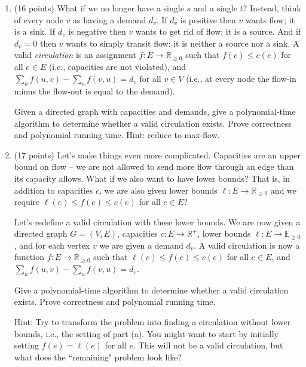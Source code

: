 \documentclass[11pt]{article}
\begin{document}
\begin{enumerate}
\item (16 points) What if we no longer have a single $s$ and a single $t$?  Instead, think of every node $v$ as having a demand $d_v$.  If $d_v$ is positive then $v$ wants flow; it is a sink.  If $d_v$ is negative then $v$ wants to get rid of flow; it is a source.  And if $d_v = 0$ then $v$ wants to simply transit flow; it is neither a source nor a sink.  A valid \emph{circulation} is an assignment $f : E \rightarrow \mathbb{R}_{\geq 0}$ such that $f(e) \leq c(e)$ for all $e \in E$ (i.e., capacities are not violated), and $\sum_{u} f(u,v) - \sum_{u} f(v,u) = d_v$ for all $v \in V$ (i.e., at every node the flow-in minus the flow-out is equal to the demand).  

Given a directed graph with capacities and demands, give a polynomial-time algorithm to determine whether a valid circulation exists.  Prove correctness and polynomial running time.  Hint: reduce to max-flow.

\item (17 points) Let's make things even more complicated.  Capacities are an upper bound on flow -- we are not allowed to send more flow through an edge than its capacity allows.  What if we also want to have lower bounds?  That is, in addition to capacities $c$, we are also given lower bounds $\ell : E \rightarrow \mathbb{R}_{\geq 0}$ and we require $\ell(e) \leq f(e) \leq c(e)$ for all $e \in E$?

Let's redefine a valid circulation with these lower bounds.  We are now given a directed graph $G = (V,E)$, capacities $c : E \rightarrow \mathbb{R}^+$, lower bounds $\ell : E \rightarrow \mathbb{E}_{\geq 0}$, and for each vertex $v$ we are given a demand $d_v$.  A valid circulation is now a function $f : E \rightarrow \mathbb{R}_{\geq 0}$ such that $\ell(e) \leq f(e) \leq c(e)$ for all $e \in E$, and $\sum_{u} f(u,v) - \sum_{u} f(v,u) = d_v$.  

Give a polynomial-time algorithm to determine whether a valid circulation exists.  Prove correctness and polynomial running time. 

Hint: Try to transform the problem into finding a circulation without lower bounds, i.e., the setting of part (a).  You might want to start by initially setting $f(e)= \ell(e)$ for all $e$.  This will not be a valid circulation, but what does the ``remaining" problem look like?
\end{enumerate}
\end{document}
